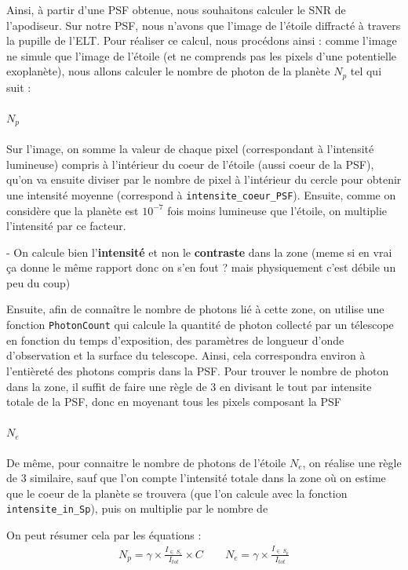 Ainsi, à partir d'une PSF obtenue, nous souhaitons calculer le SNR de l'apodiseur.
Sur notre PSF, nous n'avons que l'image de l'étoile diffracté à travers la pupille de l'ELT. Pour réaliser ce calcul, nous procédons ainsi : comme l'image ne simule que l'image de l'étoile (et ne comprends pas les pixels d'une potentielle exoplanète), nous allons calculer le nombre de photon de la planète $N_p$ tel qui suit : 
\paragraph{$N_p$}
Sur l'image, on somme la valeur de chaque pixel (correspondant à l'intensité lumineuse) compris à l'intérieur du coeur de l'étoile (aussi coeur de la PSF), qu'on va ensuite diviser par le nombre de pixel à l'intérieur du cercle pour obtenir une intensité moyenne (correspond à \texttt{intensite\_coeur\_PSF}). Ensuite, comme on considère que la planète est $10^{-7}$ fois moins lumineuse que l'étoile, on multiplie l'intensité par ce facteur.

\quad - On calcule bien l'\textbf{intensité} et non le \textbf{contraste} dans la zone (meme si en vrai ça donne le même rapport donc on s'en fout ? mais physiquement c'est débile un peu du coup)

Ensuite, afin de connaître le nombre de photons lié à cette zone, on utilise une fonction \texttt{PhotonCount} qui calcule la quantité de photon collecté par un télescope en fonction du temps d'exposition, des paramètres de longueur d'onde d'observation et la surface du telescope. Ainsi, cela correspondra environ à l'entièreté des photons compris dans la PSF.
Pour trouver le nombre de photon dans la zone, il suffit de faire une règle de 3 en divisant le tout par intensite totale de la PSF, donc en moyenant tous les pixels composant la PSF
\paragraph{$N_e$}
De même, pour connaitre le nombre de photons de l'étoile $N_e$, on réalise une règle de 3 similaire, sauf que l'on compte l'intensité totale dans la zone où on estime que le coeur de la planète se trouvera (que l'on calcule avec la fonction \texttt{intensite\_in\_Sp}), puis on multiplie par le nombre de 

On peut résumer cela par les équations :
\begin{align*}
    \boxed{N_p = \gamma \times \frac{I_{\in\: S_e}}{I_{tot}} \times  C} \qquad \boxed{N_e = \gamma \times \frac{I_{\in \:S_p}}{I_{tot}}}
\end{align*}

